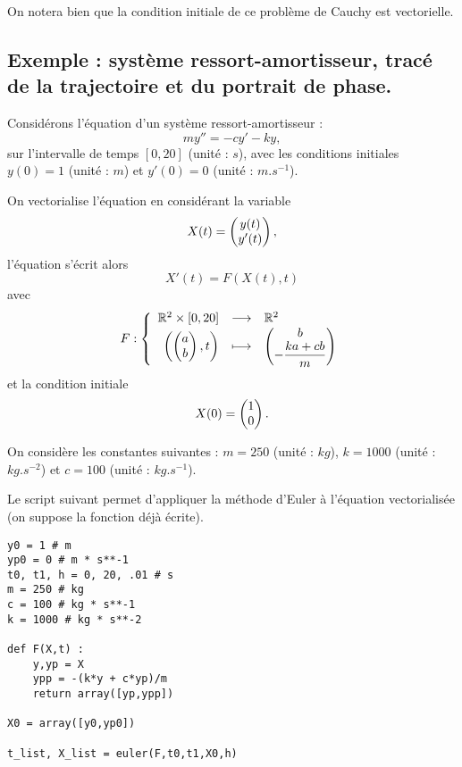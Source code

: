 \begin{rem}
    On notera bien que la condition initiale de ce problème de Cauchy est vectorielle. 
\end{rem}

\subsection{Exemple : système ressort-amortisseur, tracé de la trajectoire et du portrait de phase.}

Considérons l'équation d'un système ressort-amortisseur : 
\begin{equation*}
  m y'' = - c y' - ky,
\end{equation*}
sur l'intervalle de temps $[0,20]$ (unité : $s$), avec les conditions initiales $y(0) = 1$ (unité : $m$) et $y'(0) = 0$ (unité : $m.s^{-1}$).

On vectorialise l'équation en considérant la variable 
\begin{equation*}
    X(t) = \begin{pmatrix} y(t) \\ y'(t) \end{pmatrix},
\end{equation*}
l'équation s'écrit alors 
\begin{equation*}
    X'(t) = F(X(t),t)
\end{equation*}
avec 
\begin{equation*}
    F : \left\{\begin{array}{rcl} \mathbb{R}^2\times [0,20] & \longrightarrow &\mathbb{R}^2 \\ \left( \begin{pmatrix} a\\b \end{pmatrix} , t \right) &\longmapsto &  \begin{pmatrix} b \\ -\dfrac{ka+cb}{m} \end{pmatrix}\end{array}\right.
\end{equation*}
et la condition initiale
\begin{equation*}
    X(0) = \begin{pmatrix} 1\\0 \end{pmatrix}. 
\end{equation*}


On considère les constantes suivantes : $m = 250$ (unité : $kg$), $k = 1000$ (unité : $kg.s^{-2}$) et $c = 100$ (unité : $kg.s^{-1}$).

Le script suivant permet d'appliquer la méthode d'Euler à l'équation vectorialisée (on suppose la fonction  déjà écrite). 
\begin{lstlisting}
y0 = 1 # m
yp0 = 0 # m * s**-1
t0, t1, h = 0, 20, .01 # s
m = 250 # kg
c = 100 # kg * s**-1
k = 1000 # kg * s**-2

def F(X,t) :
    y,yp = X
    ypp = -(k*y + c*yp)/m
    return array([yp,ypp])

X0 = array([y0,yp0])

t_list, X_list = euler(F,t0,t1,X0,h)
\end{lstlisting}

